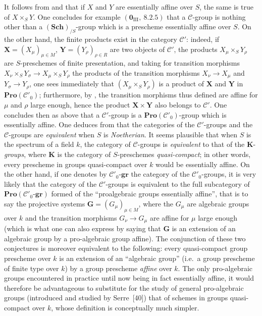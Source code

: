 \begin{remark}[8.13.6]
\label{IV.8.13.6}
It follows from  and  that if $X$ and $Y$ are essentially affine over $S$, the same is true of $X\times_S Y$.
One concludes for example $(\mathbf{0}_{\text{III}},~8.2.5)$ that a $\mathcal{C}$-group is nothing other than a $(\mathbf{Sch})_{/S}$-group which is a prescheme essentially affine over $S$.
On the other hand, the finite products exist in the category $\mathcal{C}'$: indeed, if $\mathbf{X}=(X_\mu)_{\mu\in M}$, $\mathbf{Y}=(Y_\rho)_{\rho\in R}$ are two objects of $\mathcal{C}'$, the products $X_\mu\times_S Y_\rho$ are $S$-preschemes of finite presentation, and taking for transition morphisms $X_\nu\times_S Y_\sigma\to X_\mu\times_S Y_\rho$ the products of the transition morphisms $X_\nu\to X_\mu$ and $Y_\sigma\to Y_\rho$, one sees immediately that $(X_\mu\times_S Y_\rho)$ is a product of $\mathbf{X}$ and $\mathbf{Y}$ in $\mathbf{Pro}(\mathcal{C}'_0)$; furthermore, by , the transition morphisms thus defined are affine for $\mu$ and $\rho$ large enough, hence the product $\mathbf{X}\times\mathbf{Y}$ also belongs to $\mathcal{C}'$.
One concludes then as above that a $\mathcal{C}'$-group is a $\mathbf{Pro}(\mathcal{C}'_0)$-group which is essentially affine.
One deduces from  that the categories of the $\mathcal{C}'$-groups and the $\mathcal{C}$-groups are \emph{equivalent} when $S$ is \emph{Noetherian}.
It seems plausible that when $S$ is the spectrum of a field $k$, the category of $\mathcal{C}$-groups is \emph{equivalent} to that of the $\boldsymbol{K}$-\emph{groups}, where $\boldsymbol{K}$ is the category of $S$-preschemes \emph{quasi-compact}; in other words, every prescheme in groups quasi-compact over $k$ would be essentially affine.
On the other hand, if one denotes
by $\mathcal{C}'_0$-$\boldsymbol{gr}$ the category of the $\mathcal{C}'_0$-groups, it is very likely that the category of the $\mathcal{C}'$-groups is equivalent to the full subcategory of $\mathbf{Pro}(\mathcal{C}'_0\text{-}\boldsymbol{gr})$ formed of the ``proalgebraic groups essentially affine'', that is to say the projective systems $\mathbf{G}=(G_\mu)_{\mu\in M}$, where the $G_\mu$ are algebraic groups over $k$ and the transition morphisms $G_\nu\to G_\mu$ are affine for $\mu$ large enough (which is what one can also express by saying that $\mathbf{G}$ is an extension of an algebraic group by a pro-algebraic group affine).
The conjunction of these two conjectures is moreover equivalent to the following: every quasi-compact group prescheme over $k$ is an extension of an ``algebraic group'' (i.e.\ a group prescheme of finite type over $k$) by a group prescheme \emph{affine} over $k$.
The only pro-algebraic groups encountered in practice until now being in fact essentially affine, it would therefore be advantageous to substitute for the study of general pro-algebraic groups (introduced and studied by Serre~[40]) that of schemes in groups quasi-compact over $k$, whose definition is conceptually much simpler.
\end{remark}

